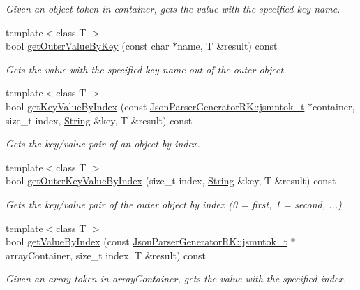 \begin{DoxyCompactItemize}
\begin{DoxyCompactList}\small\item\em Given an object token in container, gets the value with the specified key name. \end{DoxyCompactList}\item 
{\footnotesize template$<$class T $>$ }\\bool \hyperlink{class_json_parser_a38858994342cd2735b716b117bf8afdf}{get\+Outer\+Value\+By\+Key} (const char $\ast$name, T \&result) const
\begin{DoxyCompactList}\small\item\em Gets the value with the specified key name out of the outer object. \end{DoxyCompactList}\item 
{\footnotesize template$<$class T $>$ }\\bool \hyperlink{class_json_parser_a5759f53499dcb4418e07e9c5e1a42442}{get\+Key\+Value\+By\+Index} (const \hyperlink{struct_json_parser_generator_r_k_1_1jsmntok__t}{Json\+Parser\+Generator\+R\+K\+::jsmntok\+\_\+t} $\ast$container, size\+\_\+t index, \hyperlink{class_string}{String} \&key, T \&result) const
\begin{DoxyCompactList}\small\item\em Gets the key/value pair of an object by index. \end{DoxyCompactList}\item 
{\footnotesize template$<$class T $>$ }\\bool \hyperlink{class_json_parser_a4718893bc6350e129a9acbf6cb5a47ad}{get\+Outer\+Key\+Value\+By\+Index} (size\+\_\+t index, \hyperlink{class_string}{String} \&key, T \&result) const
\begin{DoxyCompactList}\small\item\em Gets the key/value pair of the outer object by index (0 = first, 1 = second, ...) \end{DoxyCompactList}\item 
{\footnotesize template$<$class T $>$ }\\bool \hyperlink{class_json_parser_a53bd8a6ebb0d9b246b876653e792368f}{get\+Value\+By\+Index} (const \hyperlink{struct_json_parser_generator_r_k_1_1jsmntok__t}{Json\+Parser\+Generator\+R\+K\+::jsmntok\+\_\+t} $\ast$array\+Container, size\+\_\+t index, T \&result) const
\begin{DoxyCompactList}\small\item\em Given an array token in array\+Container, gets the value with the specified index. \end{DoxyCompactList}\item 

\end{DoxyCompactItemize}
